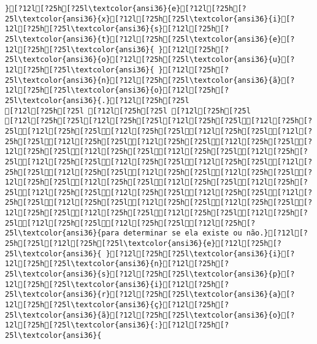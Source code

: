 \documentclass{scrartcl}
\begin{document}
\begin{Verbatim}
}[?12l[?25h[?25l\textcolor{ansi36}{e}[?12l[?25h[?25l\textcolor{ansi36}{x}[?12l[?25h[?25l\textcolor{ansi36}{i}[?12l[?25h[?25l\textcolor{ansi36}{s}[?12l[?25h[?25l\textcolor{ansi36}{t}[?12l[?25h[?25l\textcolor{ansi36}{e}[?12l[?25h[?25l\textcolor{ansi36}{ }[?12l[?25h[?25l\textcolor{ansi36}{o}[?12l[?25h[?25l\textcolor{ansi36}{u}[?12l[?25h[?25l\textcolor{ansi36}{ }[?12l[?25h[?25l\textcolor{ansi36}{n}[?12l[?25h[?25l\textcolor{ansi36}{ã}[?12l[?25h[?25l\textcolor{ansi36}{o}[?12l[?25h[?25l\textcolor{ansi36}{.}[?12l[?25h[?25l
[?12l[?25h[?25l [?12l[?25h[?25l [?12l[?25h[?25l
[?12l[?25h[?25l[?12l[?25h[?25l[?12l[?25h[?25l[?12l[?25h[?25l[?12l[?25h[?25l[?12l[?25h[?25l[?12l[?25h[?25l[?12l[?25h[?25l[?12l[?25h[?25l[?12l[?25h[?25l[?12l[?25h[?25l[?12l[?25h[?25l[?12l[?25h[?25l[?12l[?25h[?25l[?12l[?25h[?25l[?12l[?25h[?25l[?12l[?25h[?25l[?12l[?25h[?25l[?12l[?25h[?25l[?12l[?25h[?25l[?12l[?25h[?25l[?12l[?25h[?25l[?12l[?25h[?25l[?12l[?25h[?25l[?12l[?25h[?25l[?12l[?25h[?25l[?12l[?25h[?25l[?12l[?25h[?25l[?12l[?25h[?25l[?12l[?25h[?25l[?12l[?25h[?25l[?12l[?25h[?25l[?12l[?25h[?25l[?12l[?25h[?25l[?12l[?25h[?25l[?12l[?25h[?25l[?12l[?25h[?25l[?12l[?25h[?25l[?12l[?25h[?25l[?12l[?25h[?25l\textcolor{ansi36}{para determinar se ela existe ou não.}[?12l[?25h[?25l[?12l[?25h[?25l\textcolor{ansi36}{e}[?12l[?25h[?25l\textcolor{ansi36}{ }[?12l[?25h[?25l\textcolor{ansi36}{i}[?12l[?25h[?25l\textcolor{ansi36}{n}[?12l[?25h[?25l\textcolor{ansi36}{s}[?12l[?25h[?25l\textcolor{ansi36}{p}[?12l[?25h[?25l\textcolor{ansi36}{i}[?12l[?25h[?25l\textcolor{ansi36}{r}[?12l[?25h[?25l\textcolor{ansi36}{a}[?12l[?25h[?25l\textcolor{ansi36}{ç}[?12l[?25h[?25l\textcolor{ansi36}{ã}[?12l[?25h[?25l\textcolor{ansi36}{o}[?12l[?25h[?25l\textcolor{ansi36}{:}[?12l[?25h[?25l\textcolor{ansi36}{ 
\end{Verbatim}
\end{document}
